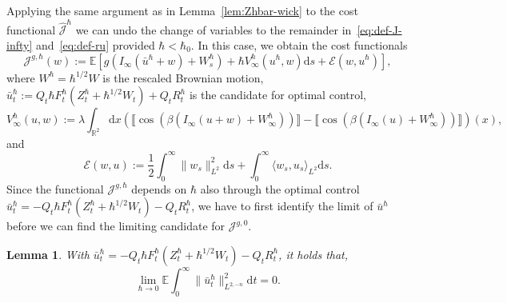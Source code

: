 \documentclass[11pt, a4paper]{scrartcl}
\numberwithin{equation}{section}
\theoremstyle{plain}
\newtheorem{lemma}[foo]{Lemma}
\theoremstyle{remark}
\newcommand{\assign}{:=}
\newcommand{\mathd}{\mathrm{d}}
\newcommand{\nobracket}{}
\begin{document}
Applying the same argument as in Lemma~\ref{lem:Zhbar-wick} to the cost
functional $\hat{\mathcal{J}}^{\hbar}$ we can undo the change of variables to
the remainder in~\eqref{eq:def-J-infty} and~\eqref{eq:def-ru} provided $\hbar
< \hbar_0$. In this case, we obtain the cost functionals
\begin{equation}
  \mathcal{J}^{g, \hbar} (w) \assign \mathbb{E} [g (I_{\infty}
  (\bar{u}^{\hbar} + w) + W^{\hbar}_s) + \hbar V_{\infty}^{\hbar} (u^{\hbar},
  w) \mathd s \nobracket + \nobracket \mathcal{E} (w, u^{\hbar})]
  \label{eq:def-Jhbar},
\end{equation}
where $W^{\hbar} = \hbar^{1 / 2} W$ is the rescaled Brownian motion,
$\bar{u}^{\hbar}_t \assign Q_t \hbar F^{\hbar}_t (Z^{\hbar}_t + \hbar^{1 / 2}
W_t) + Q_t R_t^{\hbar}$ is the candidate for optimal control,
\[ V_{\infty}^{\hbar} (u, w) \assign \lambda \int_{\mathbb{R}^2} \mathd x
   (\llbracket \cos (\beta (I_{\infty} (u + w) + W^{\hbar}_{\infty}))
   \rrbracket - \llbracket \cos (\beta (I_{\infty} (u) + W^{\hbar}_{\infty}))
   \rrbracket) (x), \]
and
\[ \mathcal{E} (w, u) \assign \frac{1}{2}  \int_0^{\infty} \| w_s \|^2_{L^2}
   \mathd s + \int_0^{\infty} \langle w_s, u_s \rangle_{L^2} \mathd s. \]
Since the functional $\mathcal{J}^{g,\hbar}$ depends on $\hbar$ also through the
optimal control $\bar{u}^{\hbar}_t = - Q_t \hbar F^{\hbar}_t (Z^{\hbar}_t +
\hbar^{1 / 2} W_t) - Q_t R_t^{\hbar}$, we have to first identify the limit of
$\bar{u}^{\hbar}$ before we can find the limiting candidate for
$\mathcal{J}^{g,0}$.

\begin{lemma}
  \label{lem:uhbar-to-0}With $\bar{u}^{\hbar}_t = - Q_t \hbar F^{\hbar}_t
  (Z^{\hbar}_t + \hbar^{1 / 2} W_t) - Q_t R_t^{\hbar}$, it holds that,
  \begin{equation}
    \lim_{\hbar \rightarrow 0} \mathbb{E} \int_0^{\infty} \| \bar{u}^{\hbar}_t
    \|_{L^{2, - n}}^2 \mathd t = 0. \label{eq:uhbar-to-0}
  \end{equation}
\end{lemma}
\end{document}
